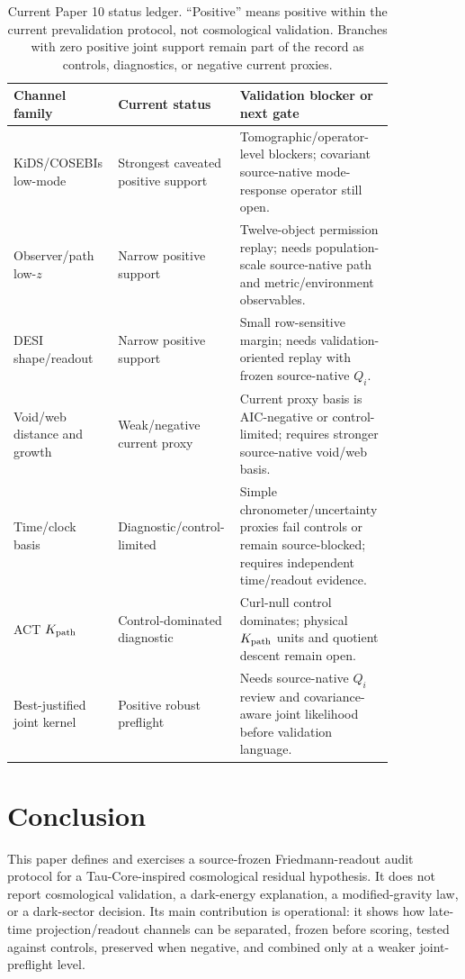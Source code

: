 \begin{table}[t]
\centering
\small
\caption{Current Paper 10 status ledger.  ``Positive'' means positive within
the current prevalidation protocol, not cosmological validation.  Branches with
zero positive joint support remain part of the record as controls, diagnostics,
or negative current proxies.}
\label{tab:paper10-status-ledger}
\begin{tabular}{p{0.23\linewidth}p{0.23\linewidth}p{0.38\linewidth}}
\toprule
Channel family & Current status & Validation blocker or next gate \\
\midrule
KiDS/COSEBIs low-mode & Strongest caveated positive support &
Tomographic/operator-level blockers; covariant source-native mode-response
operator still open. \\
Observer/path low-\(z\) & Narrow positive support &
Twelve-object permission replay; needs population-scale source-native path and
metric/environment observables. \\
DESI shape/readout & Narrow positive support &
Small row-sensitive margin; needs validation-oriented replay with frozen
source-native \(Q_i\). \\
Void/web distance and growth & Weak/negative current proxy &
Current proxy basis is AIC-negative or control-limited; requires stronger
source-native void/web basis. \\
Time/clock basis & Diagnostic/control-limited &
Simple chronometer/uncertainty proxies fail controls or remain source-blocked;
requires independent time/readout evidence. \\
ACT \(K_{\rm path}\) & Control-dominated diagnostic &
Curl-null control dominates; physical \(K_{\rm path}\) units and quotient
descent remain open. \\
Best-justified joint kernel & Positive robust preflight &
Needs source-native \(Q_i\) review and covariance-aware joint likelihood before
validation language. \\
\bottomrule
\end{tabular}
\end{table}


\section{Conclusion}

This paper defines and exercises a source-frozen Friedmann-readout audit
protocol for a Tau-Core-inspired cosmological residual hypothesis.  It does not
report cosmological validation, a dark-energy explanation, a modified-gravity
law, or a dark-sector decision.  Its main contribution is operational: it shows
how late-time projection/readout channels can be separated, frozen before
scoring, tested against controls, preserved when negative, and combined only at
a weaker joint-preflight level.

